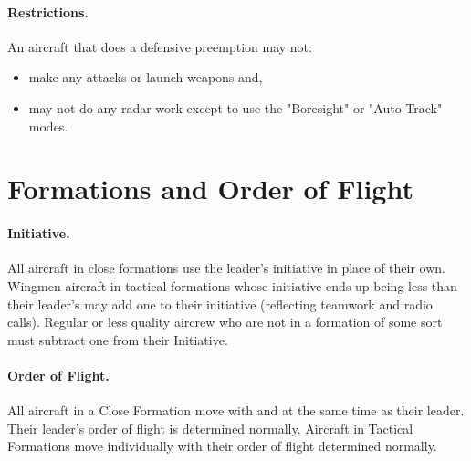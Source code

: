 \paragraph{Restrictions.} An aircraft that does a defensive preemption may not:  

\begin{itemize}
    \item make any attacks or launch weapons and,
    \item may not do any radar work except to use the "Boresight" or "Auto-Track" modes.
\end{itemize}	


\advancedrules

\section
{Formations and Order of Flight}

\paragraph{Initiative.} All aircraft in close formations use the leader's initiative in place of their own. Wingmen aircraft in tactical formations whose initiative ends up being less than their leader's may add one to their initiative (reflecting teamwork and radio calls). Regular or less quality aircrew who are not in a formation of some sort must subtract one from their Initiative.

\paragraph{Order of Flight.} All aircraft in a Close Formation move with and at the same time as their leader. Their leader's order of flight is determined normally. Aircraft in Tactical Formations move individually with their order of flight determined normally.